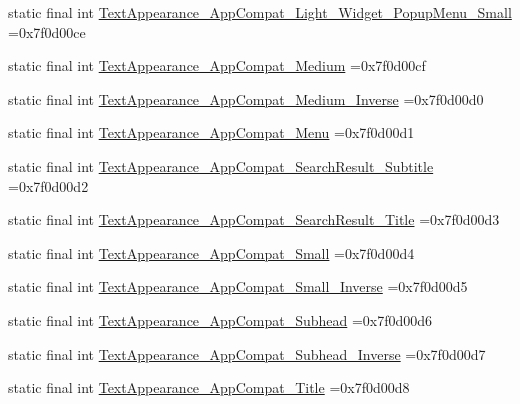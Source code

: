 \begin{DoxyCompactItemize}
\item 
static final int \mbox{\hyperlink{classcom_1_1example_1_1trainawearapplication_1_1_r_1_1style_afc338054f248cd6a037669bc47b318da}{Text\+Appearance\+\_\+\+App\+Compat\+\_\+\+Light\+\_\+\+Widget\+\_\+\+Popup\+Menu\+\_\+\+Small}} =0x7f0d00ce
\item 
static final int \mbox{\hyperlink{classcom_1_1example_1_1trainawearapplication_1_1_r_1_1style_a92d76e358c4c751ca127b207fbfe469f}{Text\+Appearance\+\_\+\+App\+Compat\+\_\+\+Medium}} =0x7f0d00cf
\item 
static final int \mbox{\hyperlink{classcom_1_1example_1_1trainawearapplication_1_1_r_1_1style_ad74ae8c83d1c00d2c28820eeacf8c663}{Text\+Appearance\+\_\+\+App\+Compat\+\_\+\+Medium\+\_\+\+Inverse}} =0x7f0d00d0
\item 
static final int \mbox{\hyperlink{classcom_1_1example_1_1trainawearapplication_1_1_r_1_1style_a2c1cb6b962265a56ff425e80bb4258c2}{Text\+Appearance\+\_\+\+App\+Compat\+\_\+\+Menu}} =0x7f0d00d1
\item 
static final int \mbox{\hyperlink{classcom_1_1example_1_1trainawearapplication_1_1_r_1_1style_aee956e0f7cd63b3cc39fa883a1f03395}{Text\+Appearance\+\_\+\+App\+Compat\+\_\+\+Search\+Result\+\_\+\+Subtitle}} =0x7f0d00d2
\item 
static final int \mbox{\hyperlink{classcom_1_1example_1_1trainawearapplication_1_1_r_1_1style_a41fde8883870743bc786cdd65dcf2c3f}{Text\+Appearance\+\_\+\+App\+Compat\+\_\+\+Search\+Result\+\_\+\+Title}} =0x7f0d00d3
\item 
static final int \mbox{\hyperlink{classcom_1_1example_1_1trainawearapplication_1_1_r_1_1style_ae27ec73cdc9ff03b6bb71915f3ffb515}{Text\+Appearance\+\_\+\+App\+Compat\+\_\+\+Small}} =0x7f0d00d4
\item 
static final int \mbox{\hyperlink{classcom_1_1example_1_1trainawearapplication_1_1_r_1_1style_a28847c68e930a2eb24995dcac45dd3a5}{Text\+Appearance\+\_\+\+App\+Compat\+\_\+\+Small\+\_\+\+Inverse}} =0x7f0d00d5
\item 
static final int \mbox{\hyperlink{classcom_1_1example_1_1trainawearapplication_1_1_r_1_1style_a3c29755df395fabe4e6369b2ab2fabff}{Text\+Appearance\+\_\+\+App\+Compat\+\_\+\+Subhead}} =0x7f0d00d6
\item 
static final int \mbox{\hyperlink{classcom_1_1example_1_1trainawearapplication_1_1_r_1_1style_a81a9af8fbb855839e218e24ceda77671}{Text\+Appearance\+\_\+\+App\+Compat\+\_\+\+Subhead\+\_\+\+Inverse}} =0x7f0d00d7
\item 
static final int \mbox{\hyperlink{classcom_1_1example_1_1trainawearapplication_1_1_r_1_1style_a8916617acb37e923bf14f4a38bde8d64}{Text\+Appearance\+\_\+\+App\+Compat\+\_\+\+Title}} =0x7f0d00d8

\end{DoxyCompactItemize}
